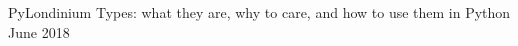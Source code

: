 \nopagebreak
\begin{cvawards}

\cvaward
  {PyLondinium}
  {Types: what they are, why to care, and how to use them in Python}
  {}
  {June 2018}

\end{cvawards}
